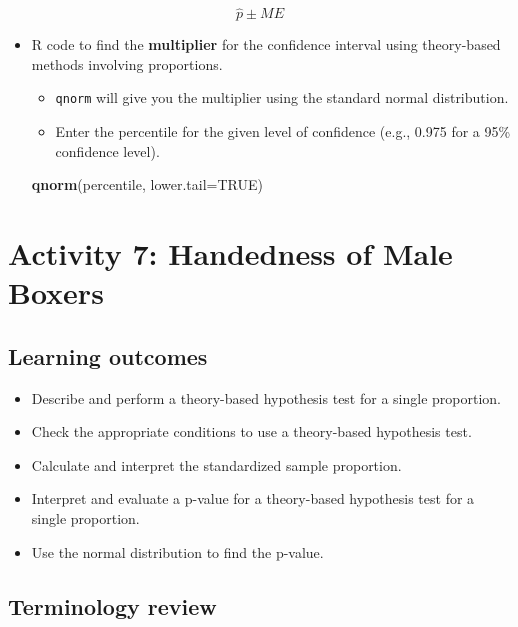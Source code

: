 \documentclass[
]{report}
\newenvironment{Shaded}{\begin{snugshade}}{\end{snugshade}}
\newcommand{\AttributeTok}[1]{\textcolor[rgb]{0.13,0.29,0.53}{#1}}
\newcommand{\ConstantTok}[1]{\textcolor[rgb]{0.56,0.35,0.01}{#1}}
\newcommand{\FunctionTok}[1]{\textcolor[rgb]{0.13,0.29,0.53}{\textbf{#1}}}
\newcommand{\NormalTok}[1]{#1}
\begin{document}
\[\hat{p} \pm ME\]

\begin{itemize}
\item
  R code to find the \textbf{multiplier} for the confidence interval using theory-based methods involving proportions.

  \begin{itemize}
  \item
    \texttt{qnorm} will give you the multiplier using the standard normal distribution.
  \item
    Enter the percentile for the given level of confidence (e.g., 0.975 for a 95\% confidence level).
  \end{itemize}

\begin{Shaded}
\begin{Highlighting}[]
\FunctionTok{qnorm}\NormalTok{(percentile, }\AttributeTok{lower.tail=}\ConstantTok{TRUE}\NormalTok{)}
\end{Highlighting}
\end{Shaded}
\end{itemize}

\newpage

\section{Activity 7: Handedness of Male Boxers}\label{activity-7-handedness-of-male-boxers}


\subsection{Learning outcomes}\label{learning-outcomes-6}

\begin{itemize}
\item
  Describe and perform a theory-based hypothesis test for a single proportion.
\item
  Check the appropriate conditions to use a theory-based hypothesis test.
\item
  Calculate and interpret the standardized sample proportion.
\item
  Interpret and evaluate a p-value for a theory-based hypothesis test for a single proportion.
\item
  Use the normal distribution to find the p-value.
\end{itemize}

\subsection{Terminology review}\label{terminology-review-5}
\end{document}
